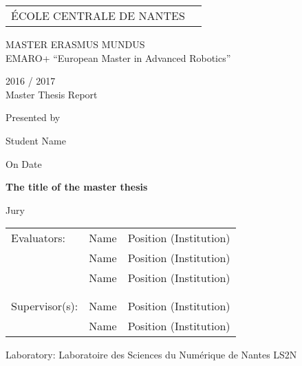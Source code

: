 \thispagestyle{empty}

\def\lskip{\vspace{0.5cm}}


\begin{tabular}{p{7cm}p{8cm}}
ÉCOLE CENTRALE DE NANTES
&
\end{tabular}

\vspace{2cm}


\begin{center} \large\sc MASTER ERASMUS MUNDUS \\ \normalsize{EMARO+ ``European Master in Advanced Robotics''} \end{center}


\begin{center}
	2016 / 2017\\
	\lskip
	Master Thesis Report %
	\lskip
	
	Presented by \lskip 
	
	Student Name \lskip
	
	On Date \lskip\lskip
	
	{\Large \textbf{The title of the master thesis}}
	
	\vfill

Jury \lskip
		
	\end{center}
	


\begin{tabular}{p{3cm}p{7cm}p{5cm} }
 Evaluators: & Name & Position (Institution) \\
	      & Name & Position (Institution) \\ 
	      & Name & Position (Institution) \\ & & \\  & & \\ 
  Supervisor(s):  & Name & Position (Institution) \\
		  & Name & Position (Institution) \\
\end{tabular}

\lskip

\begin{flushleft}
 Laboratory: Laboratoire des Sciences du Numérique de Nantes LS2N
\end{flushleft}

\newpage
\thispagestyle{empty}
\null
\newpage
\addtocounter{page}{-1}
\pagestyle{fancy}
